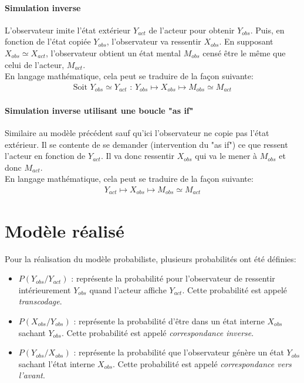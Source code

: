 \documentclass[poster]{polytech/polytech}
\begin{document}
\paragraph{Simulation inverse}
L'observateur imite l'état extérieur $Y_{act}$ de l'acteur pour obtenir $Y_{obs}$. Puis, en fonction de l'état copiée $Y_{obs}$, l'observateur va ressentir $X_{obs}$. En supposant $X_{obs}\simeq X_{act}$, l'observateur obtient un état mental $M_{obs}$ censé être le même que celui de l'acteur, $M_{act}$.\\
En langage mathématique, cela peut se traduire de la façon suivante:
\begin{align*}
\text{Soit }Y_{obs}\simeq Y_{act}\text{ : } Y_{obs}\mapsto X_{obs}\mapsto M_{obs}\simeq M_{act}
\end{align*}

\paragraph{Simulation inverse utilisant une boucle "as if"}
Similaire au modèle précédent sauf qu'ici l'observateur ne copie pas l'état extérieur. Il se contente de se demander (intervention du "as if") ce que ressent l'acteur en fonction de $Y_{act}$. Il va donc ressentir $X_{obs}$ qui va le mener à $M_{obs}$ et donc $M_{act}$.\\
En langage mathématique, cela peut se traduire de la façon suivante:
\begin{align*}
Y_{act}\mapsto X_{obs}\mapsto M_{obs}\simeq M_{act}
\end{align*}

\section{Modèle réalisé}
Pour la réalisation du modèle probabiliste, plusieurs probabilités ont été définies:
\begin{itemize}
\item $P(Y_{obs}/Y_{act})$ : représente la probabilité pour l'observateur de ressentir intérieurement $Y_{obs}$ quand l'acteur affiche $Y_{act}$. Cette probabilité est appelé \textit{transcodage}.
\item $P(X_{obs}/Y_{obs})$ : représente la probabilité d'être dans un état interne $X_{obs}$ sachant $Y_{obs}$. Cette probabilité est appelé \textit{correspondance inverse}.
\item $P(Y_{obs}/X_{obs})$ : représente la probabilité que l'observateur génère un état $Y_{obs}$ sachant l'état interne $X_{obs}$. Cette probabilité est appelé \textit{correspondance vers l'avant}.\\
\end{itemize}
\end{document}
